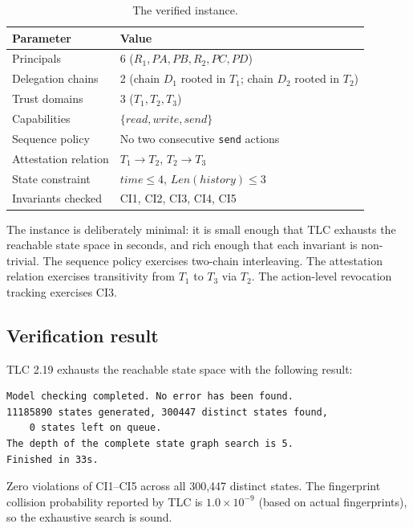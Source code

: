 \documentclass[11pt,a4paper]{article}
\theoremstyle{plain}
\theoremstyle{definition}
\theoremstyle{remark}
\begin{document}
\begin{table}[t]
\centering
\small
\begin{tabular}{@{}ll@{}}
\toprule
\textbf{Parameter} & \textbf{Value} \\
\midrule
Principals & 6 ($R_1, PA, PB, R_2, PC, PD$) \\
Delegation chains & 2 (chain $D_1$ rooted in $T_1$; chain $D_2$ rooted in $T_2$) \\
Trust domains & 3 ($T_1, T_2, T_3$) \\
Capabilities & $\{\mathit{read}, \mathit{write}, \mathit{send}\}$ \\
Sequence policy & No two consecutive \texttt{send} actions \\
Attestation relation & $T_1 \to T_2$, $T_2 \to T_3$ \\
State constraint & $\mathit{time} \le 4$, $\mathit{Len}(\mathit{history}) \le 3$ \\
Invariants checked & CI1, CI2, CI3, CI4, CI5 \\
\bottomrule
\end{tabular}
\caption{The verified instance.}
\label{tab:instance}
\end{table}

The instance is deliberately minimal: it is small enough that TLC exhausts the
reachable state space in seconds, and rich enough that each invariant is
non-trivial. The sequence policy exercises two-chain interleaving. The
attestation relation exercises transitivity from $T_1$ to $T_3$ via $T_2$. The
action-level revocation tracking exercises CI3.

\subsection{Verification result}

TLC 2.19 exhausts the reachable state space with the following result:

\begin{verbatim}
Model checking completed. No error has been found.
11185890 states generated, 300447 distinct states found,
    0 states left on queue.
The depth of the complete state graph search is 5.
Finished in 33s.
\end{verbatim}

Zero violations of CI1--CI5 across all 300{,}447 distinct states. The
fingerprint collision probability reported by TLC is $1.0 \times 10^{-9}$
(based on actual fingerprints), so the exhaustive search is sound.
\end{document}
